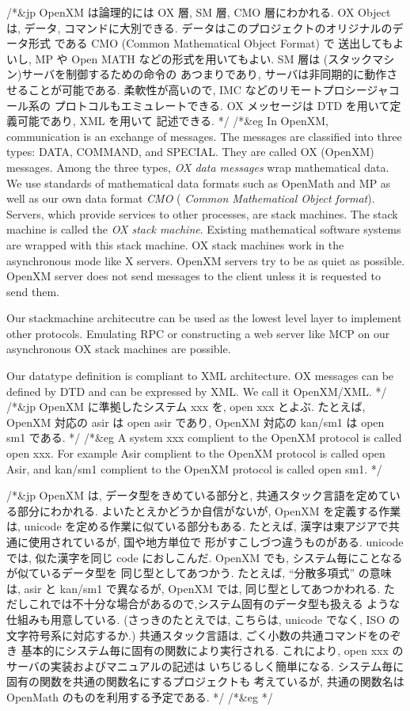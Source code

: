 /*&jp
OpenXM は論理的には
OX 層, SM 層, CMO 層にわかれる.
OX Object は, データ, コマンドに大別できる.
データはこのプロジェクトのオリジナルのデータ形式
である CMO (Common Mathematical Object Format) で
送出してもよいし, MP や Open MATH などの形式を用いてもよい.
SM 層は (スタックマシン)サーバを制御するための命令の
あつまりであり, サーバは非同期的に動作させることが可能である.
柔軟性が高いので, IMC などのリモートプロシージャコール系の
プロトコルもエミュレートできる.
OX メッセージは DTD を用いて定義可能であり, XML を用いて
記述できる.
*/
/*&eg 
In OpenXM, communication is an exchange of messages. 
The messages are classified
into three types: DATA, COMMAND, and SPECIAL.  They are called OX
(OpenXM) messages.  Among the three types, {\it OX data messages} wrap
mathematical data.  We use standards of mathematical data formats such
as OpenMath and MP as well as our own data format {\it CMO} ({\it
Common Mathematical Object format}).  Servers, which provide services
to other processes, are stack machines.  The stack machine is called
the {\it OX stack machine}.  Existing mathematical software systems are
wrapped with this stack machine.  OX stack machines work in the
asynchronous mode like X servers. 
OpenXM servers try to be as quiet as possible.
OpenXM server does not send messages to the client unless it is requested
to send them. 

Our stackmachine architecutre can be used as the lowest level layer
to implement other protocols.
Emulating RPC or constructing a web server like MCP
\cite{iamc} on our asynchronous OX stack machines
are possible.

Our datatype definition is compliant to XML architecture.
OX messages can be defined by DTD and can be expressed by XML.
We call it OpenXM/XML.
*/
/*&jp
OpenXM に準拠したシステム xxx を, open xxx とよぶ.
たとえば, OpenXM 対応の asir は open asir であり,
OpenXM 対応の kan/sm1 は open sm1 である.
*/
/*&eg
A system xxx complient to the OpenXM protocol is called open xxx.
For example Asir complient to the OpenXM protocol is called open Asir, and
kan/sm1 complient to the OpenXM protocol is called open sm1.
*/

/*&jp
OpenXM は, データ型をきめている部分と,
共通スタック言語を定めている部分にわかれる.
よいたとえかどうか自信がないが,
OpenXM を定義する作業は, unicode を定める作業に似ている部分もある.
たとえば, 漢字は東アジアで共通に使用されているが, 国や地方単位で
形がすこしづつ違うものがある.
unicode では, 似た漢字を同じ code におしこんだ.
OpenXM でも, システム毎にことなるが似ているデータ型を
同じ型としてあつかう.
たとえば, ``分散多項式'' の意味は, asir と kan/sm1 で異なるが,
OpenXM では, 同じ型としてあつかわれる.
ただしこれでは不十分な場合があるので,システム固有のデータ型も扱える
ような仕組みも用意している.
(さっきのたとえでは, こちらは, unicode でなく, ISO の文字符号系に対応するか.)
共通スタック言語は, ごく小数の共通コマンドをのぞき
基本的にシステム毎に固有の関数により実行される.
これにより, open xxx のサーバの実装およびマニュアルの記述は
いちじるしく簡単になる.
システム毎に固有の関数を共通の関数名にするプロジェクトも
考えているが, 共通の関数名は OpenMath のものを利用する予定である.
*/
/*&eg
*/




